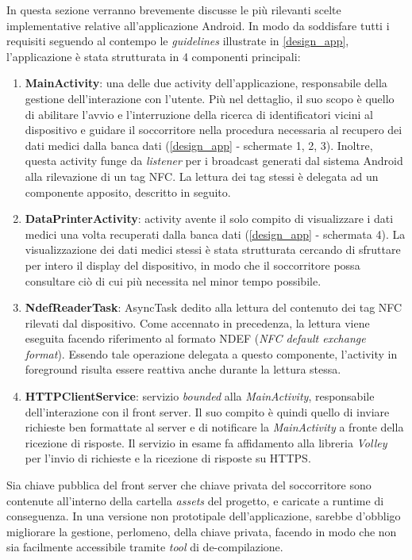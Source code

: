 \documentclass[a4paper,12pt]{report}
\begin{document}
In questa sezione verranno brevemente discusse le più rilevanti scelte implementative relative all'applicazione Android. In modo da soddisfare tutti i requisiti seguendo al contempo le \emph{guidelines} illustrate in \autoref{design_app}, l'applicazione è stata strutturata in 4 componenti principali:
\begin{enumerate}
	\item \textbf{MainActivity}: una delle due activity dell'applicazione, responsabile della gestione dell'interazione con l'utente. Più nel dettaglio, il suo scopo è quello di abilitare l'avvio e l'interruzione della ricerca di identificatori vicini al dispositivo e guidare il soccorritore nella procedura necessaria al recupero dei dati medici dalla banca dati (\autoref{design_app} - schermate 1, 2, 3). Inoltre, questa activity funge da \emph{listener} per i broadcast generati dal sistema Android alla rilevazione di un tag NFC. La lettura dei tag stessi è delegata ad un componente apposito, descritto in seguito.
	\item \textbf{DataPrinterActivity}: activity avente il solo compito di visualizzare i dati medici una volta recuperati dalla banca dati (\autoref{design_app} - schermata 4). La visualizzazione dei dati medici stessi è stata strutturata cercando di sfruttare per intero il display del dispositivo, in modo che il soccorritore possa consultare ciò di cui più necessita nel minor tempo possibile. 
	\item \textbf{NdefReaderTask}: AsyncTask dedito alla lettura del contenuto dei tag NFC rilevati dal dispositivo. Come accennato in precedenza, la lettura viene eseguita facendo riferimento al formato NDEF (\emph{NFC default exchange format}). Essendo tale operazione delegata a questo componente, l'activity in foreground risulta essere reattiva anche durante la lettura stessa.
	\item \textbf{HTTPClientService}: servizio \emph{bounded} alla \emph{MainActivity}, responsabile dell'interazione con il front server. Il suo compito è quindi quello di inviare richieste ben formattate al server e di notificare la \emph{MainActivity} a fronte della ricezione di risposte. Il servizio in esame fa affidamento alla libreria \emph{Volley} per l'invio di richieste e la ricezione di risposte su HTTPS.
\end{enumerate}

Sia chiave pubblica del front server che chiave privata del soccorritore sono contenute all'interno della cartella \emph{assets} del progetto, e caricate a runtime di conseguenza. In una versione non prototipale dell'applicazione, sarebbe d'obbligo migliorare la gestione, perlomeno, della chiave privata, facendo in modo che non sia facilmente accessibile tramite \emph{tool} di de-compilazione. 
\end{document}
